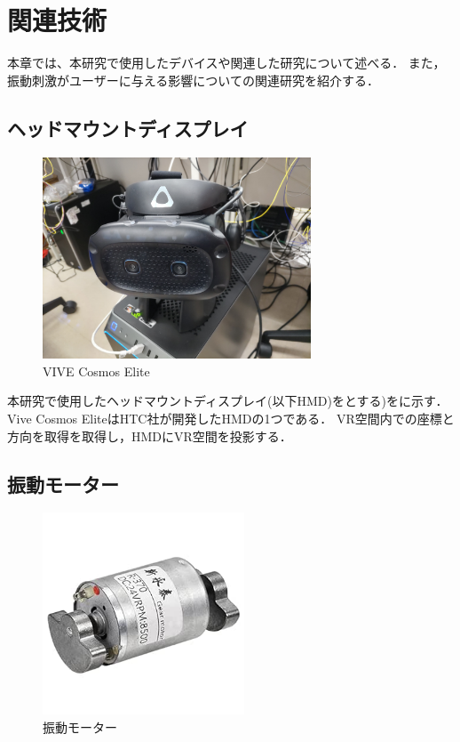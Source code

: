 \chapter{関連技術}

本章では、本研究で使用したデバイスや関連した研究について述べる．
また，振動刺激がユーザーに与える影響についての関連研究を紹介する．

\section{ヘッドマウントディスプレイ}

\begin{figure}[h]
\centering
\includegraphics[clip,width=8cm]{./fig/VIVE.png}
\caption{VIVE Cosmos Elite}\label{vive}
\end{figure}

本研究で使用したヘッドマウントディスプレイ(以下HMD)をとする)をに示す．
Vive Cosmos EliteはHTC社が開発したHMDの1つである．
VR空間内での座標と方向を取得を取得し，HMDにVR空間を投影する．




\newpage

\section{振動モーター}

\begin{figure}[h]
\centering
\includegraphics[clip,width=6cm]{./fig/Motor.jpg}
\caption{振動モーター}\label{motor}
\end{figure}

